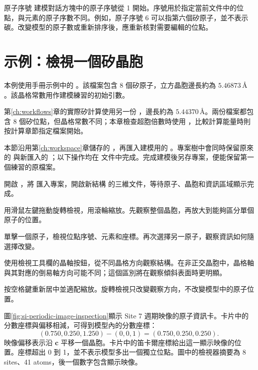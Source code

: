 \begin{notebox}{原子序號}
建模對話方塊中的原子序號從 1 開始。序號用於指定當前文件中的位點，與元素的原子序數不同。例如，原子序號 6 可以指第六個矽原子，並不表示碳。改變模型的原子數或重新排序後，應重新核對需要編輯的位點。
\end{notebox}

\section{示例：檢視一個矽晶胞}

本例使用手冊示例中的 \mbox{}。該檔案包含 8 個矽原子，立方晶胞邊長約為 $5.46873\,\text{\AA}$。該晶格常數用作建模練習的初始引數。

第\ref{ch:workflows}章的實際矽計算使用另一份 ，邊長約為 $5.44370\,\text{\AA}$。兩份檔案都包含 8 個矽位點，但晶格常數不同；本章檢查超胞倍數時使用 \mbox{}，比較計算能量時則按計算章節指定檔案開始。

本節沿用第\ref{ch:workspace}章儲存的 ，再匯入建模用的 。專案樹中會同時保留原來的  與新匯入的 ；以下操作均在  文件中完成。完成建模後另存專案，便能保留第一個練習的原檔案。

\begin{steps}
  \item 開啟 ，將  匯入專案，開啟新結構  的三維文件，等待原子、晶胞和資訊區域顯示完成。
  \item 用滑鼠左鍵拖動旋轉檢視，用滾輪縮放。先觀察整個晶胞，再放大到能夠區分單個原子的位置。
  \item 單擊一個原子，檢視位點序號、元素和座標。再次選擇另一原子，觀察資訊如何隨選擇改變。
  \item 使用檢視工具欄的晶軸按鈕，從不同晶格方向觀察結構。在非正交晶胞中，晶格軸與其對應的倒易軸方向可能不同；這個區別將在觀察傾斜表面時更明顯。
  \item 按空格鍵重新居中並適配縮放。旋轉檢視只改變觀察方向，不改變模型中的原子位置。
\end{steps}

圖\ref{fig:si-periodic-image-inspection}顯示 Site 7 週期映像的原子資訊卡。卡片中的分數座標與偏移相減，可得到模型內的分數座標：
\[
 (0.750,0.250,1.250)-(0,0,1)=(0.750,0.250,0.250).
\]
映像偏移表示沿 $\mathbf c$ 平移一個晶胞。卡片中的笛卡爾座標給出這一顯示映像的位置。座標超出 0 到 1，並不表示模型多出一個獨立位點。圖中的檢視器摘要為 8 sites、41 atoms，後一個數字包含顯示映像。

